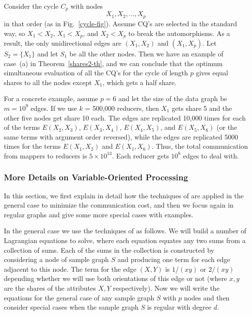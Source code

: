 \begin{example}
\label{shares2-ex}
Consider the cycle $C_p$ with nodes
$$X_1,X_2,\ldots,X_p$$
in that order (as in Fig.~\ref{cycle-fig}).
Assume CQ's are selected in the standard way, so $X_1<X_2$, $X_1<X_p$, and $X_2<X_p$ to break the automorphisms.  As a result, the only unidirectional edges are $(X_1,X_2)$ and $(X_1,X_p)$.  Let $S_2 = \{X_1\}$ and let $S_1$ be all the other nodes.
Then we have an example of case~(a) in Theorem~\ref{shares2-th}, and we can conclude that the optimum simultaneous evaluation of all the CQ's for the cycle of length $p$ gives equal shares to all the nodes except $X_1$, which gets a half share.

For a concrete example, assume $p=6$ and let the size of the data graph be $m=10^9$ edges. If we use $k$ = 500,000 reducers, then $X_1$ gets share 5 and the other five nodes get share 10 each.  The edges are replicated 10,000 times for each of the terms $E(X_2,X_3)$, $E(X_3,X_4)$, $E(X_4,X_5)$, and $E(X_5,X_6)$ (or the same terms with argument order reversed), while the edges are replicated 5000 times for the terms $E(X_1,X_2)$ and $E(X_1,X_6)$.  Thus, the total communication from mappers to reducers is $5\times10^{13}$.
Each reducer gets $10^8$ edges to deal with.
\end{example}


\subsubsection{More Details on Variable-Oriented Processing}
\label{examples-combine-subsec}

In this section, we first explain in detail how the techniques of \cite{AU10} are
applied in the general case to minimize the communication cost, and then
we focus again in regular graphs and give some more special cases with examples.

In the general case we use the techniques of \cite{AU10} as follows. We will build a number of Lagrangian equations to solve, where each equation equates any two
sums from a collection of sums. Each of the sums in the collection is constructed by
considering a node of sample graph $S$ and producing one term
for each edge adjacent to this node. The term for
the edge $(X,Y)$ is $1/(xy)$ or $2/(xy)$ depending
whether we will use both orientations of this edge or not
(where $x,y$ are the shares of the attributes $X,Y$ respectively).
Now we will write the equations for the general case of any sample
graph $S$ with $p$ nodes and then consider special cases  when the sample graph
$S$ is regular with degree $d$.

